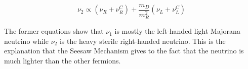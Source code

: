 \begin{equation}
\nu_2 \propto \left( \nu_R + \nu_R^C \right) + \frac{m_D}{m_R^2} \left( \nu_L + \nu_L^C \right)
\end{equation}

The former equations show that $\nu_1$ is mostly the left-handed light Majorana neutrino while $\nu_2$ is the heavy sterile right-handed neutrino. This is the explanation that the Seesaw Mechanism gives to the fact that the neutrino is much lighter than the other fermions. 
 
 
 
 
 
 